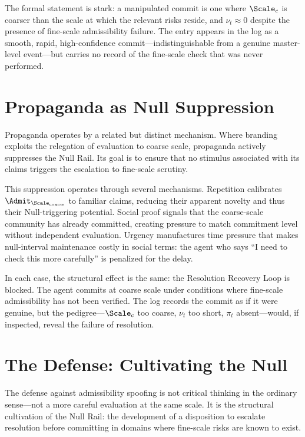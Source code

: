 \documentclass[11pt,oneside]{book}
\begin{document}
The formal statement is stark: a manipulated commit is one where $\Scale_c$ is coarser than the scale at which the relevant risks reside, and $\nu_t \approx 0$ despite the presence of fine-scale admissibility failure. The entry appears in the log as a smooth, rapid, high-confidence commit---indistinguishable from a genuine master-level event---but carries no record of the fine-scale check that was never performed.

\section{Propaganda as Null Suppression}

Propaganda operates by a related but distinct mechanism. Where branding exploits the relegation of evaluation to coarse scale, propaganda actively suppresses the Null Rail. Its goal is to ensure that no stimulus associated with its claims triggers the escalation to fine-scale scrutiny.

This suppression operates through several mechanisms. Repetition calibrates $\Admit_{\Scale_{\mathrm{coarse}}}$ to familiar claims, reducing their apparent novelty and thus their Null-triggering potential. Social proof signals that the coarse-scale community has already committed, creating pressure to match commitment level without independent evaluation. Urgency manufactures time pressure that makes null-interval maintenance costly in social terms: the agent who says ``I need to check this more carefully'' is penalized for the delay.

In each case, the structural effect is the same: the Resolution Recovery Loop is blocked. The agent commits at coarse scale under conditions where fine-scale admissibility has not been verified. The log records the commit as if it were genuine, but the pedigree---$\Scale_c$ too coarse, $\nu_t$ too short, $\pi_t$ absent---would, if inspected, reveal the failure of resolution.

\section{The Defense: Cultivating the Null}

The defense against admissibility spoofing is not critical thinking in the ordinary sense---not a more careful evaluation at the same scale. It is the structural cultivation of the Null Rail: the development of a disposition to escalate resolution before committing in domains where fine-scale risks are known to exist.
\end{document}
